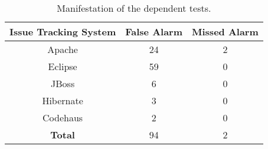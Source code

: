 \begin{table}
\centering
\setlength{\tabcolsep}{0.45\tabcolsep}
\begin{tabular}{|c||c|c|}
\hline
\textbf{Issue Tracking System} & \textbf{False Alarm} & \textbf{Missed Alarm} \\
\hline
Apache &24 & 2 \\
\hline
Eclipse & 59 & 0 \\
\hline
JBoss& 6 & 0 \\
\hline
Hibernate & 3 & 0 \\
\hline
Codehaus & 2 & 0 \\
\hline
\hline
\textbf{Total}  & 94 & 2 \\
\hline
\end{tabular}
\caption{
Manifestation of the \dtnum dependent tests.
}
\label{tab:reper}
\end{table}

